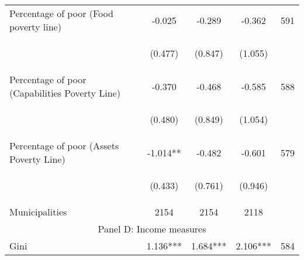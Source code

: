 \begin{tabular}{lcccc}
Percentage of poor (Food poverty line)     &  -0.025    &    -0.289   &     -0.362  &  591  \\

\vspace{4pt} &  \begin{footnotesize}(0.477)\end{footnotesize}   &
			    \begin{footnotesize}(0.847)\end{footnotesize}   &
			    \begin{footnotesize}(1.055)\end{footnotesize}   &
			     \\


Percentage of poor (Capabilities Poverty Line)     &  -0.370    &    -0.468   &     -0.585  &  588 \\

\vspace{4pt} &  \begin{footnotesize}(0.480)\end{footnotesize}   &
			    \begin{footnotesize}(0.849)\end{footnotesize}   &
			    \begin{footnotesize}(1.054)\end{footnotesize}   &
			     \\
 
Percentage of poor (Assets Poverty Line)  &  -1.014**    &    -0.482   &     -0.601  &  579  \\

\vspace{4pt} &  \begin{footnotesize}(0.433)\end{footnotesize}   &
			    \begin{footnotesize}(0.761)\end{footnotesize}   &
			    \begin{footnotesize}(0.946)\end{footnotesize}   &
			     \\

Municipalities   &   2154   &    2154     &  2118    \\
\hline	


\multicolumn{5}{c}{Panel D: Income measures} \\

Gini     &  1.136***    &    1.684***   &     2.106***  &  584   \\


\end{tabular}
